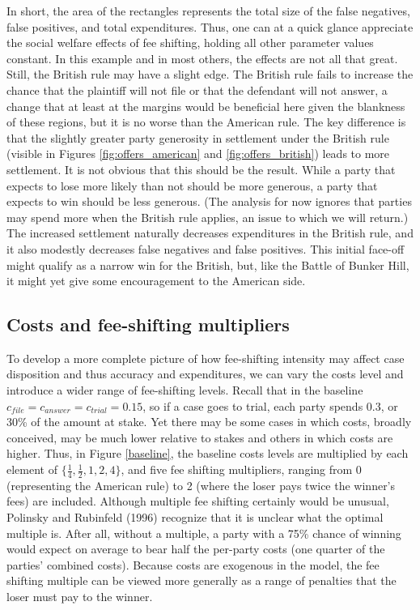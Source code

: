 \documentclass{article}
\begin{document}
In short, the area of the rectangles represents the total size of the false negatives, false positives, and total expenditures. Thus, one can at a quick glance appreciate the social welfare effects of fee shifting, holding all other parameter values constant. In this example and in most others, the effects are not all that great. Still, the British rule may have a slight edge. The British rule fails to increase the chance that the plaintiff will not file or that the defendant will not answer, a change that at least at the margins would be beneficial here given the blankness of these regions, but it is no worse than the American rule. The key difference is that the slightly greater party generosity in settlement under the British rule (visible in Figures \ref{fig:offers_american} and \ref{fig:offers_british}) leads to more settlement. It is not obvious that this should be the result. While a party that expects to lose more likely than not should be more generous, a party that expects to win should be less generous. (The analysis for now ignores that parties may spend more when the British rule applies, an issue to which we will return.) The increased settlement naturally decreases expenditures in the British rule, and it also modestly decreases false negatives and false positives. This initial face-off might qualify as a narrow win for the British, but, like the Battle of Bunker Hill, it might yet give some encouragement to the American side. 

\subsection{Costs and fee-shifting multipliers}

To develop a more complete picture of how fee-shifting intensity may affect case disposition and thus accuracy and expenditures, we can vary the costs level and introduce a wider range of fee-shifting levels. Recall that in the baseline $c_{file}=c_{answer}=c_{trial}=0.15$, so if a case goes to trial, each party spends 0.3, or 30\% of the amount at stake. Yet there may be some cases in which costs, broadly conceived, may be much lower relative to stakes and others in which costs are higher. Thus, in Figure \ref{baseline}, the baseline costs levels are multiplied by each element of $\{\frac{1}{4}, \frac{1}{2}, 1, 2, 4\}$, and five fee shifting multipliers, ranging from 0 (representing the American rule) to 2 (where the loser pays twice the winner's fees) are included. Although multiple fee shifting certainly would be unusual, Polinsky and Rubinfeld (1996) \cite{polinskyrubinfeld1996} recognize that it is unclear what the optimal multiple is. After all, without a multiple, a party with a 75\% chance of winning would expect on average to bear half the per-party costs (one quarter of the parties' combined costs). Because costs are exogenous in the model, the fee shifting multiple can be viewed more generally as a range of penalties that the loser must pay to the winner.
\end{document}

